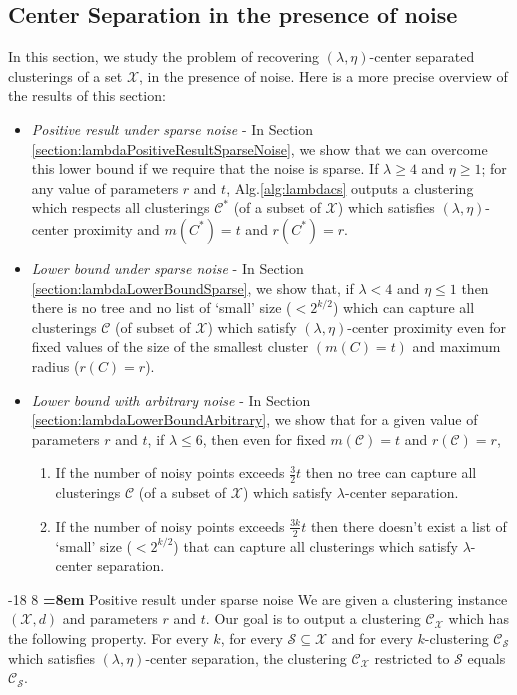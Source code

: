 \documentclass[orivec]{llncs}
\makeatletter
\newcommand{\mc}{\mathcal}
\renewcommand\subsubsection{\@startsection{subsubsection}{3}{\z@}%
   {-18\p@ \@plus -4\p@ \@minus -4\p@}%
   {8\p@ \@plus 4\p@ \@minus 4\p@}%
   {\normalfont\normalsize\bfseries\boldmath
   \rightskip=\z@ \@plus 8em \pretolerance=10000}}
\makeatother
\begin{document}
\subsection{Center Separation in the presence of noise}
\label{sec:cswith}
In this section, we study the problem of recovering $(\lambda, \eta)$-center separated clusterings of a set $\mc X$, in the presence of noise. Here is a more precise overview of the results of this section:
\begin{itemize}[nolistsep,noitemsep,leftmargin=*]
\item  {\it Positive result under sparse noise} - In Section \ref{section:lambdaPositiveResultSparseNoise}, we show that we can overcome this lower bound if we require that the noise is sparse. If $\lambda \ge 4$ and $\eta \ge 1$; for any value of parameters $r$ and $t$, Alg.\ref{alg:lambdacs} outputs a clustering which respects all clusterings $\mc C^*$ (of a subset of $\mc X$) which satisfies $(\lambda, \eta)$-center proximity and $m(C^*)=t$ and $r(C^*) = r$.
\item  {\it Lower bound under sparse noise} - In Section \ref{section:lambdaLowerBoundSparse}, we show that, if $\lambda < 4$ and $\eta \le 1$ then there is no tree and no list of `small' size ($<2^{k/2}$) which can capture all clusterings $\mc C$ (of subset of $\mc X$) which satisfy $(\lambda, \eta)$-center proximity even for fixed values of the size of the smallest cluster $(m(C) = t)$ and maximum radius ($r(C) = r$).
\item {\it Lower bound with arbitrary noise} - In Section \ref{section:lambdaLowerBoundArbitrary}, we show that for a given value of parameters $r$ and $t$, if $\lambda \le 6$, then even for fixed $m(\mc C) = t$ and $r(\mc C) = r$,
\begin{enumerate}
\item If the number of noisy points exceeds $\frac{3}{2}t$ then no tree can capture all clusterings $\mc C$ (of a subset of $\mc X$) which satisfy $\lambda$-center separation.
\item If the number of noisy points exceeds $\frac{3k}{2}t$ then there doesn't exist a list of `small' size ($<2^{k/2}$) that can capture all clusterings which satisfy $\lambda$-center separation.
\end{enumerate}


\end{itemize}

\subsubsection{Positive result under sparse noise}
\label{section:lambdaPositiveResultSparseNoise}
We are given a clustering instance $(\mc X, d)$ and parameters $r$ and $t$. Our goal is to output a clustering $\mc C_{\mc X}$ which has the following property. For every $k$, for every $\mc S \subseteq \mc X$ and for every $k$-clustering $\mc C_{\mc S}$ which satisfies $(\lambda, \eta)$-center separation, the clustering $\mc C_{\mc X}$ restricted to $\mc S$ equals $\mc C_{\mc S}$. 
\end{document}
